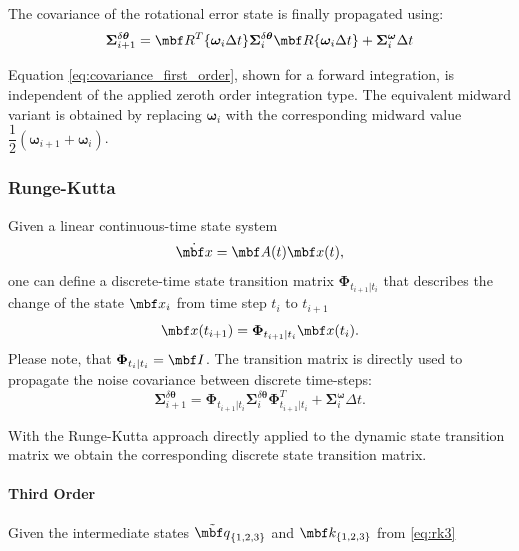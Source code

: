 \documentclass[10pt,a4paper]{article}
\newcommand{\mbs}[1]{{\boldsymbol{#1}}}
\numberwithin{equation}{section}
\begin{document}
The covariance of the rotational error state is finally propagated using:
\begin{equation}
\mbs \Sigma_{i+1}^{\delta \mbs \theta} = \mbf R^T \lbrace \mbs \omega_i \Delta t \rbrace
\mbs \Sigma_{i}^{\delta \mbs \theta}
\mbf R \lbrace \mbs \omega_i \Delta t \rbrace + 
\mbs \Sigma^{\mbs \omega}_i \Delta t
\label{eq:covariance_first_order}
\end{equation}

Equation \eqref{eq:covariance_first_order}, shown for a forward integration, is independent of the applied zeroth order integration type. The equivalent midward variant is obtained by replacing $\mbs \omega_i$ with the corresponding midward value $\dfrac{1}{2} (\mbs \omega_{i+1} + \mbs \omega_i)$.

\subsubsection{Runge-Kutta}
Given a linear continuous-time state system
\begin{equation}
\dot{\mbf x} = \mbf A(t) \mbf x(t),
\end{equation}
one can define a discrete-time state transition matrix $\mbs \Phi_{t_{i+1} | t_i}$ that describes the change of the state $\mbf x_i$ from time step $t_{i}$ to $t_{i+1}$
\begin{equation}
\mbf x(t_{i+1}) = \mbs \Phi_{t_{i+1} | t_i} \mbf x(t_i).
\end{equation}
Please note, that  $\mbs \Phi_{t_{i} | t_i} = \mbf I$.
The transition matrix is directly used to propagate the noise covariance between discrete time-steps:
\begin{equation}
\mbs \Sigma_{i+1}^{\delta \mbs \theta} = \mbs \Phi_{t_{i+1} | t_i}
\mbs \Sigma_{i}^{\delta \mbs \theta}
\mbs \Phi_{t_{i+1} | t_i}^T
 + 
\mbs \Sigma^{\mbs \omega}_i \Delta t.
\label{eq:covariance_rk}
\end{equation}

With the Runge-Kutta approach directly applied to the dynamic state transition matrix we obtain the corresponding discrete state transition matrix.

\paragraph{Third Order}

Given the intermediate states $\tilde{\mbf q}_{\lbrace 1,2,3 \rbrace}$ and $\mbf k_{\lbrace 1, 2, 3 \rbrace}$ from \eqref{eq:rk3}
\end{document}
